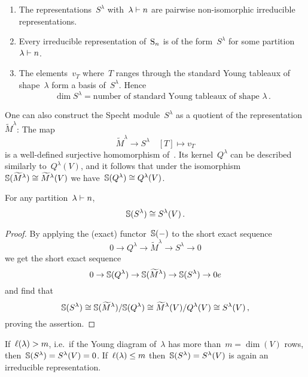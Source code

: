 \documentclass[a4paper,10pt]{scrartcl}
\begin{document}
\begin{theorem}
  \label{irreps of sn}
  \leavevmode
  \begin{enumerate}
    \item
      The representations~$S^\lambda$ with~$\lambda \vdash n$ are pairwise non-isomorphic irreducible representations.
    \item
      Every irreducible representation of~$\operatorname{S}_n$ is of the form~$S^\lambda$ for some partition~$\lambda \vdash n$.
    \item
      The elements~$v_T$ where~$T$ ranges through the standard Young tableaux of shape~$\lambda$ form a basis of~$S^\lambda$.
      Hence
      \[
        \dim S^\lambda
        =
        \text{number of standard Young tableaux of shape~$\lambda$} \,.
      \]
  \end{enumerate}
\end{theorem}

One can also construct the Specht module~$S^{\lambda}$ as a quotient of the representation~$\widetilde{M}^\lambda$:
The map
\[
  \widetilde{M}^\lambda
  \to
  S^\lambda
  \quad
  [T]
  \mapsto
  v_T
\]
is a well-defined surjective homomorphism of~{}.
Its kernel~$Q^\lambda$ can be described similarly to~$Q^\lambda(V)$, and it follows that under the isomorphism~$\mathbb{S}(\widetilde{M}^\lambda) \cong \widetilde{M}^\lambda(V)$ we have~$\mathbb{S}(Q^\lambda) \cong Q^{\lambda}(V)$.

\begin{theorem}
  For any partition~$\lambda \vdash n$,
  \[
    \mathbb{S}(S^\lambda) \cong S^{\lambda}(V) \,.
  \]
\end{theorem}

\begin{proof}
  By applying the (exact) functor~$\mathbb{S}(-)$ to the short exact sequence
  \[
    0
    \to
    Q^\lambda
    \to
    \widetilde{M}^\lambda
    \to
    S^\lambda
    \to
    0
  \]
  we get the short exact sequence
  \[
    0
    \to
    \mathbb{S}(Q^\lambda)
    \to
    \mathbb{S}(\widetilde{M}^\lambda)
    \to
    \mathbb{S}(S^\lambda)
    \to
    0
e  \]
  and find that
  \[
    \mathbb{S}(S^\lambda)
    \cong
    \mathbb{S}(\widetilde{M}^\lambda)/\mathbb{S}(Q^\lambda)
    \cong
    \widetilde{M}^{\lambda}(V)/Q^{\lambda}(V)
    \cong
    S^{\lambda}(V) \,,
  \]
  proving the assertion.
\end{proof}


\begin{remark}
  \label{kernel of schur functor}
  If~$\operatorname{\ell}(\lambda) > m$, i.e.\ if the Young diagram of~$\lambda$ has more than~$m = \dim(V)$ rows, then~$\mathbb{S}(S^\lambda) = S^\lambda(V) = 0$.
  If~$\operatorname{\ell}(\lambda) \leq m$ then~$\mathbb{S}(S^\lambda) = S^\lambda(V)$ is again an irreducible representation.
\end{remark}
\end{document}
